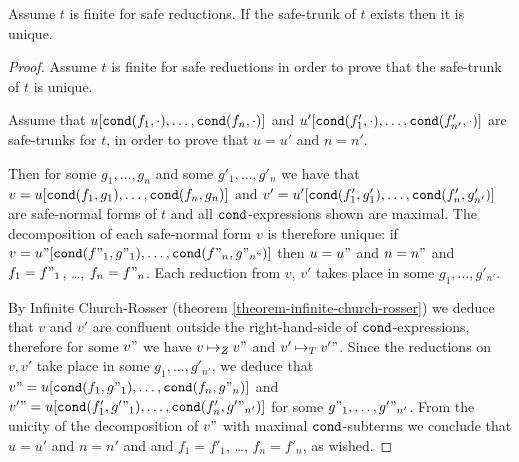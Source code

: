 \begin{lemma}
\label{lemma-safe-trunk}
Assume $t$ is finite for safe reductions.
If the  safe-trunk of $t$ exists then it is unique. 
\end{lemma}


\begin{proof}
Assume $t$ is finite for safe reductions in order to prove that the safe-trunk of $t$ is unique.

Assume that $u[{\tt cond}(f_1,\cdot), \ldots, {\tt cond}(f_n,\cdot)]$ and
$u'[{\tt cond}(f'_1,\cdot), \ldots, {\tt cond}(f'_{n'},\cdot)]$ are safe-trunks for $t$, in order to prove
that $u=u'$ and $n=n'$. 

Then for some $g_1, \ldots,g_n$ and some $g'_1, \ldots,g'_n$ we have that 
$v = u[{\tt cond}(f_1,g_1), \ldots, {\tt cond}(f_n,g_n)]$ and 
$v' = u'[{\tt cond}(f'_1,g'_1), \ldots, {\tt cond}(f'_n,g'_{n'})]$ 
are safe-normal forms of $t$ and all ${\tt cond}$-expressions shown are maximal. 
The decomposition of each safe-normal form $v$ is therefore unique:
if $v = u"[{\tt cond}(f"_1,g"_1), \ldots, {\tt cond}(f"_n,g"_{n"})]$ then $u=u"$ and $n=n"$
and $f_1=f"_1$, \ldots, $f_n=f"_n$.
Each reduction from $v$, $v'$ takes place in some $g_1, \ldots,g'_{n'}$. 

By Infinite Church-Rosser  
(theorem \ref{theorem-infinite-church-rosser}) we deduce that $v$ and $v'$ are confluent
outside the right-hand-side of ${\tt cond}$-expressions, therefore
for some $v"$ we have $v \mathbin{\mapsto}_Z v"$ and $v' \mathbin{\mapsto}_T v'"$. 
Since the reductions on $v, v'$ take place in some $g_1, \ldots,g'_{n'}$, 
we deduce that $v" = u[{\tt cond}(f_1,g"_1), \ldots, {\tt cond}(f_n,g"_n)]$
and $v'" = u[{\tt cond}(f'_1,g'"_1), \ldots, {\tt cond}(f'_n,g'"_{n'})]$ for some $g"_1, \ldots,g'"_{n'}$.
From the unicity of the decomposition of $v"$
with maximal ${\tt cond}$-subterms we conclude that $u=u'$ and $n=n'$
and and $f_1=f'_1$, \ldots, $f_n=f'_n$, as wished.

\end{proof}
